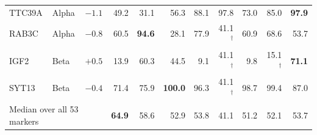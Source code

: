 \begin{table}[t]
{\begin{tabular}{llr r rrrrrrr}
TTC39A  & Alpha        & $-1.1$  & 49.2          & 31.1          & 56.3           & 88.1 & 97.8             & 73.0          & 85.0             & \textbf{97.9} \\
RAB3C   & Alpha        & $-0.8$  & 60.5          & \textbf{94.6} & 28.1           & 77.9 & 41.1$^{\dagger}$ & 60.9          & 68.6             & 53.7          \\
IGF2    & Beta         & $+0.5$  & 13.9          & 60.3          & 44.5           & 9.1  & 41.1$^{\dagger}$ & 9.8           & 15.1$^{\dagger}$ & \textbf{71.1} \\
SYT13   & Beta         & $-0.4$  & 71.4          & 75.9          & \textbf{100.0} & 96.3 & 41.1$^{\dagger}$ & 98.7          & 99.4             & 87.0          \\
\midrule
\multicolumn{3}{l}{Median over all 53 markers} & \textbf{64.9} & 58.6 & 52.9 & 53.8 & 41.1 & 51.2 & 52.1 & 53.7 \\
\bottomrule
\end{tabular}}
\end{table}
